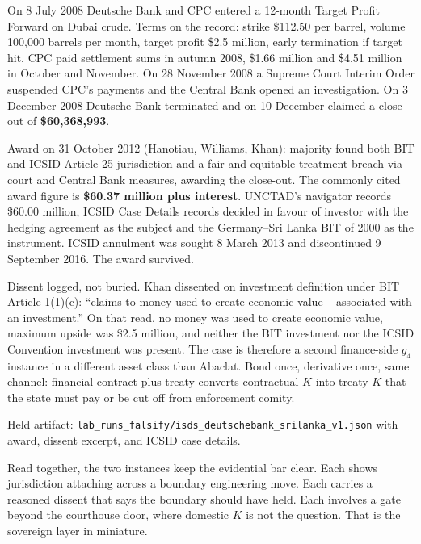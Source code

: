 On 8 July 2008 Deutsche Bank and CPC entered a 12-month Target Profit Forward on Dubai crude. Terms on the record: strike \$112.50 per barrel, volume 100,000 barrels per month, target profit \$2.5 million, early termination if target hit. CPC paid settlement sums in autumn 2008, \$1.66 million and \$4.51 million in October and November. On 28 November 2008 a Supreme Court Interim Order suspended CPC's payments and the Central Bank opened an investigation. On 3 December 2008 Deutsche Bank terminated and on 10 December claimed a close-out of \textbf{\$60,368,993}.

Award on 31 October 2012 (Hanotiau, Williams, Khan): majority found both BIT and ICSID Article 25 jurisdiction and a fair and equitable treatment breach via court and Central Bank measures, awarding the close-out. The commonly cited award figure is \textbf{\$60.37 million plus interest}. UNCTAD's navigator records \$60.00 million, ICSID Case Details records decided in favour of investor with the hedging agreement as the subject and the Germany--Sri Lanka BIT of 2000 as the instrument. ICSID annulment was sought 8 March 2013 and discontinued 9 September 2016. The award survived.

Dissent logged, not buried. Khan dissented on investment definition under BIT Article 1(1)(c): ``claims to money used to create economic value -- associated with an investment.'' On that read, no money was used to create economic value, maximum upside was \$2.5 million, and neither the BIT investment nor the ICSID Convention investment was present. The case is therefore a second finance-side $g_4$ instance in a different asset class than Abaclat. Bond once, derivative once, same channel: financial contract plus treaty converts contractual $K$ into treaty $K$ that the state must pay or be cut off from enforcement comity.

Held artifact: \texttt{lab\_runs\_falsify/isds\_deutschebank\_srilanka\_v1.json} with award, dissent excerpt, and ICSID case details.

Read together, the two instances keep the evidential bar clear. Each shows jurisdiction attaching across a boundary engineering move. Each carries a reasoned dissent that says the boundary should have held. Each involves a gate beyond the courthouse door, where domestic $K$ is not the question. That is the sovereign layer in miniature.

